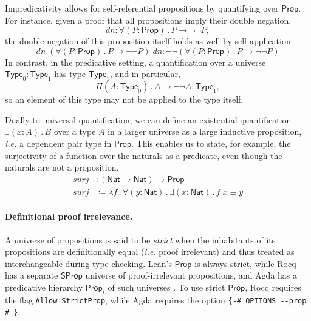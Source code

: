 \documentclass{article}
\makeatletter
\newcommand{\ie}{\textit{i.e.}\@\xspace}
\newcommand{\kw}[1]{\mathsf{#1}}
\newcommand{\code}[1]{\texttt{#1}}
\makeatother
\begin{document}
Impredicativity allows for self-referential propositions by quantifying over $\kw{Prop}$.
For instance, given a proof that all propositions imply their double negation,
$$\mathit{dn}: \forall (P : \kw{Prop})\mathpunct{.} P \to \neg \neg P,$$
the double negation of this proposition itself holds as well by self-application.
$$\mathit{dn} \; (\forall (P : \kw{Prop})\mathpunct{.} P \to \neg \neg P) \; \mathit{dn} : \neg \neg (\forall (P : \kw{Prop})\mathpunct{.} P \to \neg \neg P)$$
In contrast, in the predicative setting,
a quantification over a universe $\kw{Type}_0 : \kw{Type}_1$ has type $\kw{Type}_1$,
and in particular,
$$\Pi (A : \kw{Type}_0)\mathpunct{.} A \to \neg \neg A : \kw{Type}_1,$$
so an element of this type may not be applied to the type itself.

Dually to universal quantification,
we can define an existential quantification $\exists (x : A) \mathpunct{.} B$
over a type $A$ in a larger universe as a large inductive proposition,
\ie a dependent pair type in $\kw{Prop}$.
This enables us to state, for example,
the surjectivity of a function over the naturals as a predicate,
even though the naturals are not a proposition.
%
\begin{align*}
  \mathit{surj} &: (\kw{Nat} \to \kw{Nat}) \to \kw{Prop} \\
  \mathit{surj} &\coloneqq \lambda f \mathpunct{.}
    \forall (y : \kw{Nat}) \mathpunct{.} \exists (x : \kw{Nat}) \mathpunct{.} f \; x \equiv y
\end{align*}

\paragraph{Definitional proof irrelevance.}
A universe of propositions is said to be \emph{strict}
when the inhabitants of its propositions are definitionally equal
(\ie proof irrelevant)
and thus treated as interchangeable during type checking.
Lean's $\kw{Prop}$ is always strict, while
Rocq has a separate $\kw{SProp}$ universe of proof-irrelevant propositions,
and Agda has a predicative hierarchy $\kw{Prop}_i$ of such universes \citep{sprop}.
To use strict $\kw{Prop}$,
Rocq requires the flag \code{Allow StrictProp},
while Agda requires the option \code{\{-\# OPTIONS -{}-prop \#-\}}.
\end{document}
